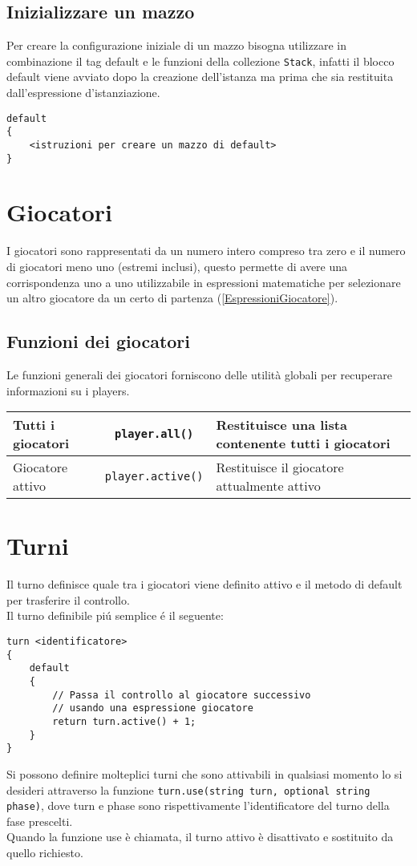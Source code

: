 \subsection{Inizializzare un mazzo}
Per creare la configurazione iniziale di un mazzo bisogna utilizzare in combinazione il tag 
default e le funzioni della collezione \lstinline|Stack|,  
infatti il blocco default viene avviato dopo la creazione dell'istanza 
ma prima che sia restituita dall'espressione d'istanziazione. \\
\begin{lstlisting}
default
{
    <istruzioni per creare un mazzo di default> 
}
\end{lstlisting}

\section{Giocatori}
I giocatori sono rappresentati da un numero intero compreso tra zero e il numero di giocatori meno uno (estremi inclusi),
questo permette di avere una corrispondenza uno a uno utilizzabile in espressioni matematiche
per selezionare un altro giocatore da un certo di partenza (\ref{EspressioniGiocatore}). \\

\subsection{Funzioni dei giocatori}
Le funzioni generali dei giocatori forniscono delle utilità globali  per recuperare informazioni 
su i players. 
\begin{center}
\begin{tabularx}{\linewidth}{|l|c|X|}
    \hline
    Tutti i giocatori & \lstinline|player.all()| & Restituisce una lista contenente tutti i giocatori \\
    \hline
    Giocatore attivo & \lstinline|player.active()| & Restituisce il giocatore attualmente attivo \\
    \hline
\end{tabularx}
\end{center}

\section{Turni}
Il turno definisce quale tra i giocatori viene definito attivo e il metodo di default
per trasferire il controllo. \\
Il turno definibile piú semplice é il seguente:
\begin{lstlisting}
turn <identificatore>
{
    default
    {
        // Passa il controllo al giocatore successivo 
        // usando una espressione giocatore
        return turn.active() + 1;
    }
}
\end{lstlisting}
Si possono definire molteplici turni che sono attivabili in qualsiasi momento lo si desideri 
attraverso la funzione \lstinline|turn.use(string turn, optional string phase)|, dove
turn e phase sono rispettivamente l'identificatore del turno della fase prescelti. \\
Quando la funzione use è chiamata, il turno attivo è disattivato e sostituito da quello richiesto.

